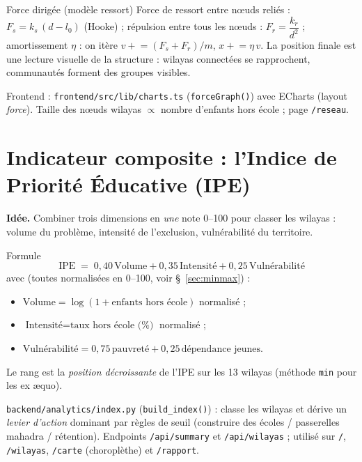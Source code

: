 \documentclass[11pt,a4paper]{article}
\newcommand{\txt}[1]{\texttt{#1}}
\begin{document}
\begin{meth}{Force dirigée (modèle ressort)}
Force de ressort entre nœuds reliés : $F_s = k_s\,(d - l_0)$ (Hooke) ;
répulsion entre tous les nœuds : $F_r = \dfrac{k_r}{d^2}$ ; amortissement
$\eta$ : on itère $v \mathrel{+}= (F_s+F_r)/m$, $x \mathrel{+}= \eta\,v$.
La position finale est une lecture visuelle de la structure : wilayas
connectées se rapprochent, communautés forment des groupes visibles.
\end{meth}

\begin{where}
Frontend : \txt{frontend/src/lib/charts.ts} (\txt{forceGraph()}) avec
ECharts (layout \emph{force}). Taille des nœuds wilayas $\propto$ nombre
d'enfants hors école ; page \txt{/reseau}.
\end{where}

\section{Indicateur composite : l'Indice de Priorité Éducative (IPE)}
\label{sec:ipe}

\textbf{Idée.} Combiner trois dimensions en \emph{une} note 0--100 pour
classer les wilayas : volume du problème, intensité de l'exclusion,
vulnérabilité du territoire.

\begin{meth}{Formule}
\[
\boxed{\;\text{IPE} \;=\; 0{,}40\,\text{Volume} + 0{,}35\,\text{Intensité}
+ 0{,}25\,\text{Vulnérabilité}\;}
\]
avec (toutes normalisées en 0--100, voir §~\ref{sec:minmax}) :
\begin{itemize}[leftmargin=2em]
  \item $\text{Volume} = \log(1+\text{enfants hors école})$ normalisé ;
  \item $\text{Intensité} = \text{taux hors école (\%)}$ normalisé ;
  \item $\text{Vulnérabilité} = 0{,}75\,\text{pauvreté} + 0{,}25\,\text{dépendance jeunes}$.
\end{itemize}
Le rang est la \emph{position décroissante} de l'IPE sur les 13 wilayas
(méthode \txt{min} pour les ex æquo).
\end{meth}

\begin{where}
\txt{backend/analytics/index.py} (\txt{build\_index()}) : classe les wilayas
et dérive un \emph{levier d'action} dominant par règles de seuil (construire
des écoles / passerelles mahadra / rétention). Endpoints \txt{/api/summary}
et \txt{/api/wilayas} ; utilisé sur \txt{/}, \txt{/wilayas}, \txt{/carte}
(choroplèthe) et \txt{/rapport}.
\end{where}
\end{document}
